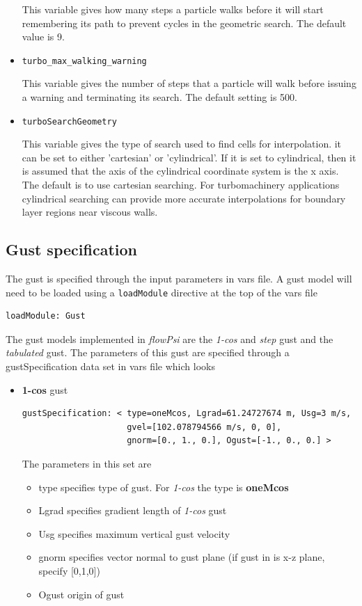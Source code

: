 \documentclass{article}
\begin{document}
\begin{list}{}{}
\begin{itemize}
This variable gives how many steps a particle walks before it will
start remembering its path to prevent cycles in the geometric search.
The default value is 9.

\item {\tt turbo\_max\_walking\_warning}

This variable gives the number of steps that a particle will walk
before issuing a warning and terminating its search.  The default
setting is 500.

\item {\tt turboSearchGeometry}

This variable gives the type of search used to find cells for
interpolation.  it can be set to either 'cartesian' or 'cylindrical'.
If it is set to cylindrical, then it is assumed that the axis of the
cylindrical coordinate system is the x axis.  The default is to use
cartesian searching.  For turbomachinery applications cylindrical
searching can provide more accurate interpolations for boundary layer
regions near viscous walls.

\end{itemize}

\subsection{Gust specification}
The gust is specified through the input parameters in vars file.
A gust model will need to be
loaded using a {\tt loadModule} directive at the top of the vars file 
\begin{verbatim}
loadModule: Gust
\end{verbatim}
The gust models implemented in \emph{flowPsi} are the \emph{1-cos} and \emph{step} gust and 
the \emph{tabulated} gust. 
The parameters of this gust are specified through a gustSpecification 
data set in vars file which looks

\begin{itemize}
\item \textbf{1-cos} gust

\begin{verbatim}
gustSpecification: < type=oneMcos, Lgrad=61.24727674 m, Usg=3 m/s, 
                     gvel=[102.078794566 m/s, 0, 0], 
                     gnorm=[0., 1., 0.], Ogust=[-1., 0., 0.] >
\end{verbatim}
The parameters in this set are
\begin{itemize}
 \item type specifies type of gust. For \emph{1-cos} the type is \textbf{oneMcos}
 \item Lgrad specifies gradient length of \emph{1-cos} gust
 \item Usg specifies maximum vertical gust velocity
 \item gnorm specifies vector normal to gust plane (if gust in is x-z plane, specify [0,1,0])
 \item Ogust origin of gust 
\end{itemize}


\end{itemize}
\end{list}
\end{document}
